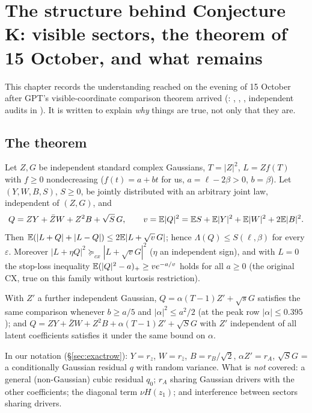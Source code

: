 \section{The structure behind Conjecture K: visible sectors, the theorem of 15 October, and what remains}\label{ch:structure}

This chapter records the understanding reached on the evening of 15 October after GPT's visible-coordinate comparison theorem arrived
(: , ,
, independent audits in ). It is written to explain \emph{why} things are true, not only that they are.

\subsection{The theorem}
\begin{theorem}\label{thm:visible}
Let $Z,G$ be independent standard complex Gaussians, $T=|Z|^2$, $L=Zf(T)$ with $f\ge0$ nondecreasing ($f(t)=a+bt$ for us, $a=\ell-2\beta>0$, $b=\beta$). Let $(Y,W,B,S)$,
$S\ge0$, be jointly distributed with an arbitrary joint law, independent of $(Z,G)$, and
\[
Q=ZY+\bar ZW+Z^2B+\sqrt S\,G,\qquad v=\mathbb E|Q|^2=\mathbb E S+\mathbb E|Y|^2+\mathbb E|W|^2+2\mathbb E|B|^2 .
\]
Then $\mathbb E(|L+Q|+|L-Q|)\le2\mathbb E|L+\sqrt v\,G|$; hence $\Lambda(Q)\le S(\ell,\beta)$ for every $\varepsilon$. Moreover $|L+\eta Q|^2\succeq_{cx}|L+\sqrt vG|^2$ ($\eta$ an independent sign), and with
$L=0$ the stop-loss inequality $\mathbb E(|Q|^2-a)_+\ge ve^{-a/v}$ holds for all $a\ge0$ (the original CX, true on this family without kurtosis restriction).
\end{theorem}
\begin{theorem}\label{thm:centered}
With $Z'$ a further independent Gaussian, $Q=\alpha(T-1)Z'+\sqrt sG$ satisfies the same comparison whenever $b\ge a/5$ and $|\alpha|^2\le a^2/2$ (at the peak row $|\alpha|\le0.395$);
and $Q=ZY+\bar ZW+Z^2B+\alpha(T-1)Z'+\sqrt SG$ with $Z'$ independent of all latent coefficients satisfies it under the same bound on $\alpha$.
\end{theorem}
In our notation (\S\ref{sec:exactrow}): $Y=r_z$, $W=r_{\bar z}$, $B=r_B/\sqrt2$, $\alpha Z'=r_A$, $\sqrt SG$ = a conditionally Gaussian residual $q$ with random variance. What is \emph{not} covered: a
general (non-Gaussian) cubic residual $q_0$; $r_A$ sharing Gaussian drivers with the other coefficients; the diagonal term $\nu H(z_1)$; and interference between sectors sharing drivers.

